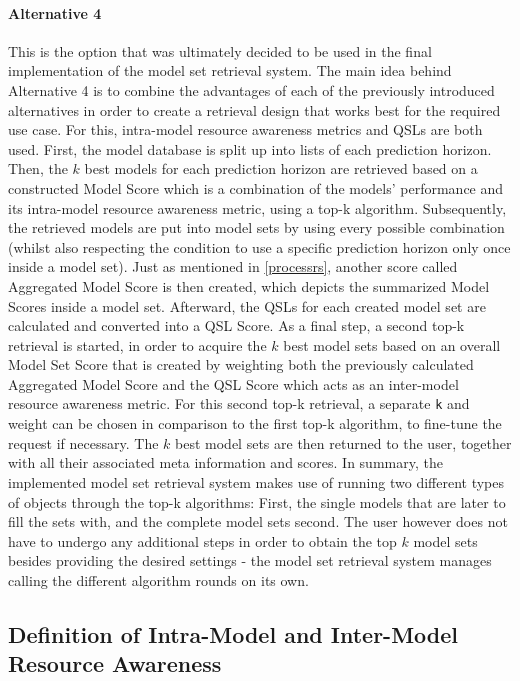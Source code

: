 \paragraph{Alternative 4}
This is the option that was ultimately decided to be used in the final implementation of the model set retrieval system. The main idea behind Alternative 4 is to combine the advantages of each of the previously introduced alternatives in order to create a retrieval design that works best for the required use case. For this, intra-model resource awareness metrics and QSLs are both used. First, the model database is split up into lists of each prediction horizon. Then, the $k$ best models for each prediction horizon are retrieved based on a constructed Model Score which is a combination of the models' performance and its intra-model resource awareness metric, using a top-k algorithm. Subsequently, the retrieved models are put into model sets by using every possible combination (whilst also respecting the condition to use a specific prediction horizon only once inside a model set). Just as mentioned in \autoref{processrs}, another score called Aggregated Model Score is then created, which depicts the summarized Model Scores inside a model set. Afterward, the QSLs for each created model set are calculated and converted into a QSL Score. As a final step, a second top-k retrieval is started, in order to acquire the $k$ best model sets based on an overall Model Set Score that is created by weighting both the previously calculated Aggregated Model Score and the QSL Score which acts as an inter-model resource awareness metric. For this second top-k retrieval, a separate \texttt{k} and weight can be chosen in comparison to the first top-k algorithm, to fine-tune the request if necessary. The $k$ best model sets are then returned to the user, together with all their associated meta information and scores. In summary, the implemented model set retrieval system makes use of running two different types of objects through the top-k algorithms: First, the single models that are later to fill the sets with, and the complete model sets second. The user however does not have to undergo any additional steps in order to obtain the top $k$ model sets besides providing the desired settings - the model set retrieval system manages calling the different algorithm rounds on its own.


\subsection{Definition of Intra-Model and Inter-Model Resource Awareness}\label{sec:defRA}

